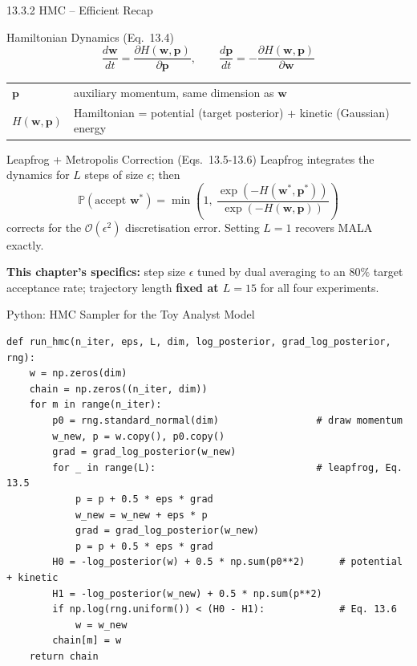 \documentclass[aspectratio=169,10pt]{beamer}
\renewcommand{\Pr}{\mathbb{P}}
\newcommand{\w}{\mathbf{w}}
\newcommand{\p}{\mathbf{p}}
\begin{document}
\begin{frame}{13.3.2 \; HMC -- Efficient Recap}
  \begin{block}{Hamiltonian Dynamics (Eq.~13.4)}
    \[
      \frac{d\w}{dt} = \frac{\partial H(\w,\p)}{\partial\p}, \qquad
      \frac{d\p}{dt} = -\frac{\partial H(\w,\p)}{\partial\w}
    \]
    \begin{tabular}{ll}
      $\p$      & auxiliary momentum, same dimension as $\w$\\
      $H(\w,\p)$ & Hamiltonian = potential (target posterior) + kinetic (Gaussian) energy\\
    \end{tabular}
  \end{block}
  \begin{block}{Leapfrog + Metropolis Correction (Eqs.~13.5-13.6)}
    Leapfrog integrates the dynamics for $L$ steps of size $\epsilon$; then
    \[
      \Pr(\text{accept } \w^*) = \min\left(1,\ \frac{\exp(-H(\w^*,\p^*))}{\exp(-H(\w,\p))}\right)
    \]
    corrects for the $\mathcal O(\epsilon^2)$ discretisation error. Setting
    $L=1$ recovers MALA exactly.
  \end{block}
  \textbf{This chapter's specifics:} step size $\epsilon$ tuned by dual
  averaging to an $80\%$ target acceptance rate; trajectory length
  \textbf{fixed at $L=15$} for all four experiments.
\end{frame}

\begin{frame}[fragile]{Python: HMC Sampler for the Toy Analyst Model}
\begin{lstlisting}[caption={From-scratch HMC (leapfrog, Eq. 13.5, + acceptance, Eq. 13.6) on the toy posterior}]
def run_hmc(n_iter, eps, L, dim, log_posterior, grad_log_posterior, rng):
    w = np.zeros(dim)
    chain = np.zeros((n_iter, dim))
    for m in range(n_iter):
        p0 = rng.standard_normal(dim)                 # draw momentum
        w_new, p = w.copy(), p0.copy()
        grad = grad_log_posterior(w_new)
        for _ in range(L):                            # leapfrog, Eq. 13.5
            p = p + 0.5 * eps * grad
            w_new = w_new + eps * p
            grad = grad_log_posterior(w_new)
            p = p + 0.5 * eps * grad
        H0 = -log_posterior(w) + 0.5 * np.sum(p0**2)      # potential + kinetic
        H1 = -log_posterior(w_new) + 0.5 * np.sum(p**2)
        if np.log(rng.uniform()) < (H0 - H1):             # Eq. 13.6
            w = w_new
        chain[m] = w
    return chain
\end{lstlisting}
\end{frame}
\end{document}
